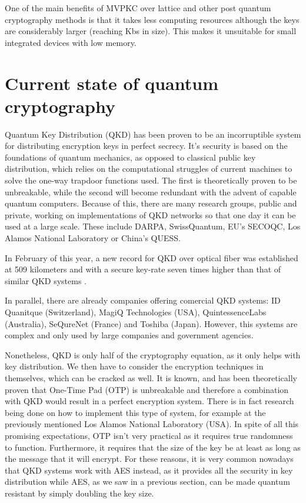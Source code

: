 One of the main benefits of MVPKC over lattice and other post quantum
cryptography methods is that it takes less computing resources although the keys
are considerably larger (reaching Kbs in size). This makes it unsuitable for
small integrated devices with low memory.

\pagebreak
\section{Current state of quantum cryptography}

Quantum Key Distribution (QKD) has been proven to be an incorruptible system
for distributing encryption keys in perfect secrecy.  It's security is
based on the foundations of quantum mechanics, as opposed to classical public
key distribution, which relies on the computational struggles of current
machines to solve the one-way trapdoor functions used. The first is
theoretically proven to be unbreakable, while the second will become redundant
with the advent of capable quantum computers.
Because of this, there are many research groups, public and private,
working on implementations of QKD networks so that one day it can be used
at a large scale. These include DARPA, SwissQuantum, EU's SECOQC, Los Alamos
National Laboratory or China's QUESS.

In February of this year, a new record for QKD over optical fiber was established at 509 kilometers and with a secure key-rate seven times higher
than that of similar QKD systems \cite{qkd_509_km_2019}.

In parallel, there are already companies offering comercial QKD systems:
ID Quanitque (Switzerland), MagiQ Technologies (USA), QuintessenceLabs
(Australia), SeQureNet (France) and Toshiba (Japan). However, this systems are
complex and only used by large companies and government agencies.

Nonetheless, QKD is only half of the cryptography equation, as it only helps
with key distribution. We then have to consider the encryption techniques
in themselves, which can be cracked as well. It is known, and has been
theoretically proven that One-Time Pad (OTP) is unbreakable and therefore
a combination with QKD would result in a perfect encryption system. There
is in fact research being done on how to implement this type of system, for
example at the previously mentioned Los Alamos National Laboratory (USA).
In spite of all this promising expectations, OTP isn't very practical as it
requires true randomness to function. Furthermore, it requires that the size
of the key be at least as long as the message that it will encrypt.
For these reasons, it is very common
nowadays that QKD systems work with AES instead, as it provides all the security
in key distribution while AES, as we saw in a previous section, can be made
quantum resistant by simply doubling the key size.


